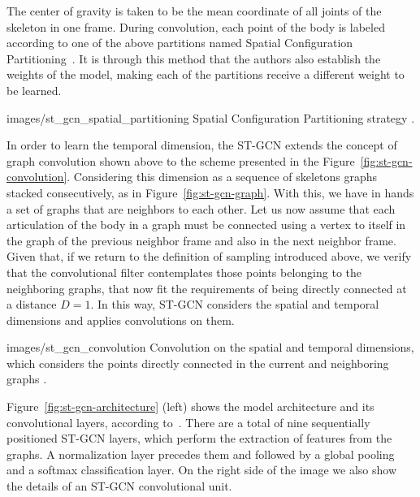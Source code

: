The center of gravity is taken to be the mean coordinate of all joints of the skeleton in one frame. During convolution, each point of the body is labeled according to one of the above partitions named Spatial Configuration Partitioning~\cite{st-gcn-2018}. It is through this method that the authors also establish the weights of the model, making each of the partitions receive a different weight to be learned.

    {images/st_gcn_spatial_partitioning}
    {Spatial Configuration Partitioning strategy \cite[p. 5]{st-gcn-2018}.}
    
In order to learn the temporal dimension, the ST-GCN extends the concept of graph convolution shown above to the scheme presented in the Figure~\ref{fig:st-gcn-convolution}. Considering this dimension as a sequence of skeletons graphs stacked consecutively, as in Figure~\ref{fig:st-gcn-graph}. With this, we have in hands a set of graphs that are neighbors to each other. Let us now assume that each articulation of the body in a graph must be connected using a vertex to itself in the graph of the previous neighbor frame and also in the next neighbor frame. Given that, if we return to the definition of sampling introduced above, we verify that the convolutional filter contemplates those points belonging to the neighboring graphs, that now fit the requirements of being directly connected at a distance $D = 1$. In this way, ST-GCN considers the spatial and temporal dimensions and applies convolutions on them.

    {images/st_gcn_convolution}
    {Convolution on the spatial and temporal dimensions, which considers the points directly connected in the current and neighboring graphs \cite[p. 3]{st-gcn-2018}.}

Figure~\ref{fig:st-gcn-architecture} (left) shows the model architecture and its convolutional layers, according to~\cite{st-gcn-2018}. There are a total of nine sequentially positioned ST-GCN layers, which perform the extraction of features from the graphs. A normalization layer precedes them and followed by a global pooling and a softmax classification layer. On the right side of the image we also show the details of an ST-GCN convolutional unit.

